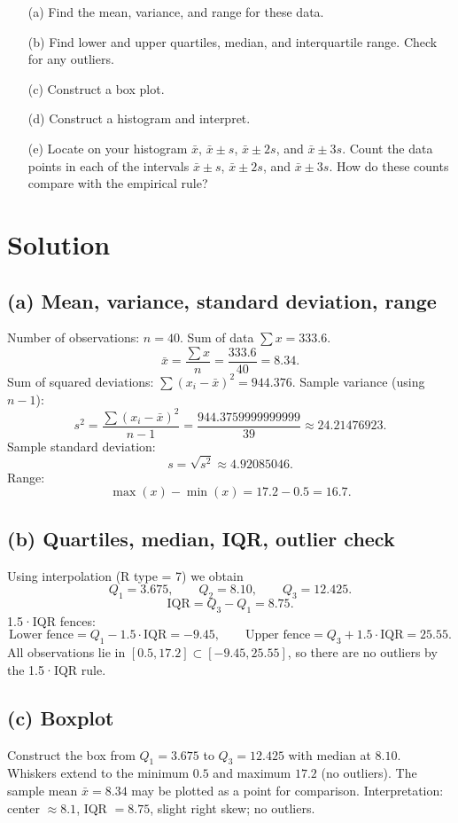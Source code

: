 \documentclass[12pt]{article}
\begin{document}
\begin{enumerate}
    \item[(a)] Find the mean, variance, and range for these data.
    \item[(b)] Find lower and upper quartiles, median, and interquartile range. Check for any outliers.
    \item[(c)] Construct a box plot.
    \item[(d)] Construct a histogram and interpret.
    \item[(e)] Locate on your histogram $\bar{x}$, $\bar{x} \pm s$, $\bar{x} \pm 2s$, and $\bar{x} \pm 3s$. Count the data points in each of the intervals 
    $\bar{x} \pm s$, $\bar{x} \pm 2s$, and $\bar{x} \pm 3s$. How do these counts compare with the empirical rule?
\end{enumerate}

\section*{Solution}

\subsection*{(a) Mean, variance, standard deviation, range}
Number of observations: $n=40$. Sum of data $\sum x = 333.6$.
\[
\bar{x}=\frac{\sum x}{n}=\frac{333.6}{40}=8.34.
\]
Sum of squared deviations: $\sum (x_i-\bar{x})^2 = 944.376$.
Sample variance (using $n-1$):
\[
s^2=\frac{\sum (x_i-\bar{x})^2}{n-1}=\frac{944.3759999999999}{39}\approx 24.21476923.
\]
Sample standard deviation:
\[
s=\sqrt{s^2}\approx 4.92085046.
\]
Range:
\[
\max(x)-\min(x)=17.2-0.5=16.7.
\]

\subsection*{(b) Quartiles, median, IQR, outlier check}
Using interpolation (R type = 7) we obtain
\[
Q_1 = 3.675,\qquad Q_2 = 8.10,\qquad Q_3 = 12.425.
\]
\[
\mathrm{IQR} = Q_3 - Q_1 = 8.75.
\]
1.5·IQR fences:
\[
\text{Lower fence} = Q_1 - 1.5\cdot\mathrm{IQR} = -9.45,\qquad
\text{Upper fence} = Q_3 + 1.5\cdot\mathrm{IQR} = 25.55.
\]
All observations lie in $[0.5,17.2]\subset[-9.45,25.55]$, so there are no outliers by the 1.5·IQR rule.

\subsection*{(c) Boxplot}
Construct the box from $Q_1=3.675$ to $Q_3=12.425$ with median at $8.10$. 
Whiskers extend to the minimum $0.5$ and maximum $17.2$ (no outliers). 
The sample mean $\bar{x}=8.34$ may be plotted as a point for comparison. 
Interpretation: center $\approx 8.1$, IQR $=8.75$, slight right skew; no outliers.
\end{document}
